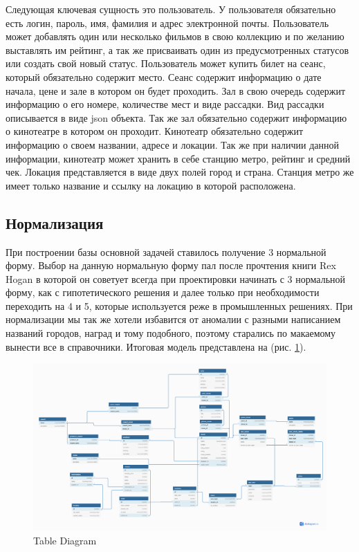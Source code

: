 \documentclass[a4paper,16pt]{article}
\begin{document}
Следующая ключевая сущность это пользователь. У пользователя обязательно есть логин, пароль, имя, фамилия и адрес электронной почты. Пользователь может добавлять один или несколько фильмов в свою коллекцию и по желанию выставлять им рейтинг, а так же присваивать один из предусмотренных статусов или создать свой новый статус. Пользователь может купить билет на сеанс, который обязательно содержит место. Сеанс содержит информацию о дате начала, цене и зале в котором он будет проходить. Зал в свою очередь содержит информацию о его номере, количестве мест и виде рассадки. Вид рассадки описывается в виде json объекта. Так же зал обязательно содержит информацию о кинотеатре в котором он проходит. Кинотеатр обязательно содержит информацию о своем названии, адресе и локации. Так же при наличии данной информации, кинотеатр может хранить в себе станцию метро, рейтинг и средний чек. Локация представляется в виде двух полей город и страна. Станция метро же имеет только название и ссылку на локацию в которой расположена.
\subsection{Нормализация}
При построении базы основной задачей ставилось получение 3 нормальной форму. Выбор на данную нормальную форму пал после прочтения книги Rex Hogan \cite{Norm} в которой он советует всегда при проектировки начинать с 3 нормальной форму, как с гипотетического решения и далее только при необходимости переходить на 4 и 5, которые используется реже в промышленных решениях. При нормализации мы так же хотели избавится от аномалии с разными написанием названий городов, наград и тому подобного, поэтому старались по макаемому вынести все в справочники. Итоговая модель представлена на (рис. \ref{fig:tables}).

\begin{figure}[h]
    \centering
    \includegraphics[scale=0.15]{iMovie db.png}
    \caption{Table Diagram}
    \label{fig:tables}
\end{figure}
\end{document}

